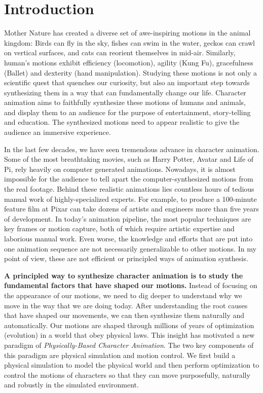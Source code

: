 \section{Introduction}

Mother Nature has created a diverse set of awe-inspiring motions in the animal kingdom: Birds can fly in the sky, fishes can swim in the water, geckos can crawl on vertical surfaces, and cats can reorient themselves in mid-air. Similarly, human's motions exhibit efficiency (locomotion), agility (Kung Fu), gracefulness (Ballet) and dexterity (hand manipulation). Studying these motions is not only a scientific quest that quenches our curiosity, but also an important step towards synthesizing them in a way that can fundamentally change our life. Character animation aims to faithfully synthesize these motions of humans and animals, and display them to an audience for the purpose of entertainment, story-telling and education. The synthesized motions need to appear realistic to give the audience an immersive experience. 

In the last few decades, we have seen tremendous advance in character animation. Some of the most breathtaking movies, such as Harry Potter, Avatar and Life of Pi, rely heavily on computer generated animations. Nowadays, it is almost impossible for the audience to tell apart the computer-synthesized motions from the real footage. Behind these realistic animations lies countless hours of tedious manual work of highly-specialized experts. For example, to produce a 100-minute feature film at Pixar can take dozens of artists and engineers more than five years of development. In today's animation pipeline, the most popular techniques are key frames or motion capture, both of which require artistic expertise and laborious manual work. Even worse, the knowledge and efforts that are put into one animation sequence are not necessarily generalizable to other motions. In my point of view, these are not efficient or principled ways of animation synthesis.

\textbf{A principled way to synthesize character animation is to study the fundamental factors that have shaped our motions.} Instead of focusing on the appearance of our motions, we need to dig deeper to understand why we move in the way that we are doing today. After understanding the root causes that have shaped our movements, we can then synthesize them naturally and automatically. Our motions are shaped through millions of years of optimization (evolution) in a world that obey physical laws. This insight has motivated a new paradigm of \emph{Physically-Based Character Animation}. The two key components of this paradigm are physical simulation and motion control. We first build a physical simulation to model the physical world and then perform optimization to control the motions of characters so that they can move purposefully, naturally and robustly in the simulated environment. 

